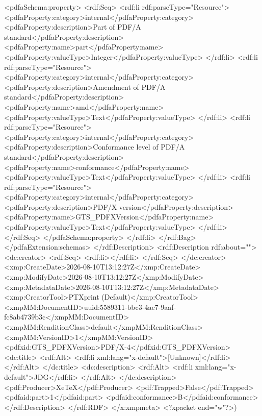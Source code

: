 {              <pdfaSchema:property>
                <rdf:Seq>
                  <rdf:li rdf:parseType="Resource">
                    <pdfaProperty:category>internal</pdfaProperty:category>
                    <pdfaProperty:description>Part of PDF/A standard</pdfaProperty:description>
                    <pdfaProperty:name>part</pdfaProperty:name>
                    <pdfaProperty:valueType>Integer</pdfaProperty:valueType>
                  </rdf:li>
                  <rdf:li rdf:parseType="Resource">
                    <pdfaProperty:category>internal</pdfaProperty:category>
                    <pdfaProperty:description>Amendment of PDF/A standard</pdfaProperty:description>
                    <pdfaProperty:name>amd</pdfaProperty:name>
                    <pdfaProperty:valueType>Text</pdfaProperty:valueType>
                  </rdf:li>
                  <rdf:li rdf:parseType="Resource">
                    <pdfaProperty:category>internal</pdfaProperty:category>
                    <pdfaProperty:description>Conformance level of PDF/A standard</pdfaProperty:description>
                    <pdfaProperty:name>conformance</pdfaProperty:name>
                    <pdfaProperty:valueType>Text</pdfaProperty:valueType>
                  </rdf:li>
                  <rdf:li rdf:parseType="Resource">
                    <pdfaProperty:category>internal</pdfaProperty:category>
                    <pdfaProperty:description>PDF/X version</pdfaProperty:description>
                    <pdfaProperty:name>GTS_PDFXVersion</pdfaProperty:name>
                    <pdfaProperty:valueType>Text</pdfaProperty:valueType>
                  </rdf:li>
                </rdf:Seq>
              </pdfaSchema:property>
            </rdf:li>
          </rdf:Bag>
        </pdfaExtension:schemas>
      </rdf:Description>
      <rdf:Description rdf:about="">
        <dc:creator>
          <rdf:Seq>
            <rdf:li></rdf:li>
          </rdf:Seq>
        </dc:creator>
        <xmp:CreateDate>2026-08-10T13:12:27Z</xmp:CreateDate>
        <xmp:ModifyDate>2026-08-10T13:12:27Z</xmp:ModifyDate>
        <xmp:MetadataDate>2026-08-10T13:12:27Z</xmp:MetadataDate>
        <xmp:CreatorTool>PTXprint (Default)</xmp:CreatorTool>
        <xmpMM:DocumentID>uuid:5589311-bbc3-4ac7-9aaf-fc8ab4739b3c</xmpMM:DocumentID>
        <xmpMM:RenditionClass>default</xmpMM:RenditionClass>
        <xmpMM:VersionID>1</xmpMM:VersionID>
        <pdfxid:GTS_PDFXVersion>PDF/X-4</pdfxid:GTS_PDFXVersion>
        <dc:title>
          <rdf:Alt>
            <rdf:li xml:lang="x-default">[Unknown]</rdf:li>
          </rdf:Alt>
        </dc:title>
        <dc:description>
          <rdf:Alt>
            <rdf:li xml:lang="x-default">JDG</rdf:li>
          </rdf:Alt>
        </dc:description>
        <pdf:Producer>XeTeX</pdf:Producer>
        <pdf:Trapped>False</pdf:Trapped>
      <pdfaid:part>1</pdfaid:part>
      <pdfaid:conformance>B</pdfaid:conformance>
      </rdf:Description>
  </rdf:RDF>
</x:xmpmeta>
<?xpacket end="w"?>)}
